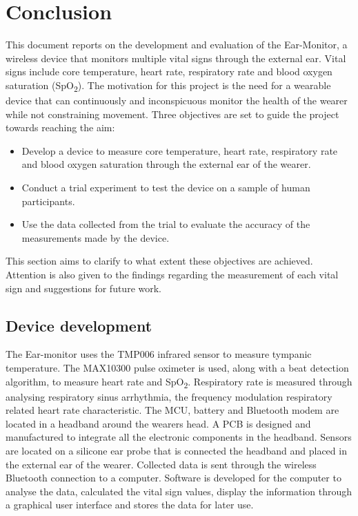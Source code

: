 \chapter{Conclusion}
\label{chp:Conclusion}
This document reports on the development and evaluation of the Ear-Monitor, a wireless device that monitors multiple vital signs through the external ear.  Vital signs include core temperature, heart rate, respiratory rate and blood oxygen saturation (SpO\textsubscript{2}). The motivation for this project is the need for a wearable device that can continuously and inconspicuous monitor the health of the wearer while not constraining movement. Three objectives are set to guide the project towards reaching the aim:

\begin{itemize}
\item Develop a device to measure core temperature, heart rate, respiratory rate and blood oxygen saturation through the external ear of the wearer.
\item Conduct a trial experiment to test the device on a sample of human participants.
\item Use the data collected from the trial to evaluate the accuracy of the measurements made by the device.
\end{itemize}

This section aims to clarify to what extent these objectives are achieved. Attention is also given to the findings regarding the measurement of each vital sign and suggestions for future work.

\section{Device development}
The Ear-monitor uses the TMP006 infrared sensor to measure tympanic temperature. The MAX10300 pulse oximeter is used, along with a beat detection algorithm, to measure heart rate and SpO\textsubscript{2}. Respiratory rate is measured through analysing respiratory sinus arrhythmia, the frequency modulation respiratory related heart rate characteristic. The MCU, battery and Bluetooth modem are located in a headband around the wearers head. A PCB is designed and manufactured to integrate all the electronic components in the headband. Sensors are located on a silicone ear probe that is connected the headband and placed in the external ear of the wearer. Collected data is sent through the wireless Bluetooth connection to a computer. Software is developed for the computer to analyse the data, calculated the vital sign values, display the information through a graphical user interface and stores the data for later use.

